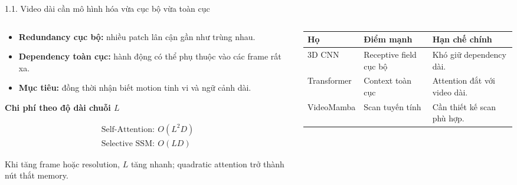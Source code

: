 \documentclass[aspectratio=169,9pt]{beamer}
\newcommand{\smallnote}[1]{{\fontsize{7.1}{8.4}\selectfont #1\par}}
\newcommand{\heading}[1]{{\bfseries\color{PTITRed} #1\par}}
\newcommand{\tightitems}{\setlength{\itemsep}{0.13em}\setlength{\parskip}{0pt}\setlength{\parsep}{0pt}}
\begin{document}
\begin{frame}{1.1. Video dài cần mô hình hóa vừa cục bộ vừa toàn cục}
  \vspace{0.08cm}
  \begin{columns}[T,onlytextwidth]
    \begin{column}{0.48\textwidth}
      \begin{tcolorbox}[titlepanel,title=Hai tính chất đối nghịch,equal height group=s1_top]
        \begin{itemize}\tightitems
          \item \textbf{Redundancy cục bộ:} nhiều patch lân cận gần như trùng nhau.
          \item \textbf{Dependency toàn cục:} hành động có thể phụ thuộc vào các frame rất xa.
          \item \textbf{Mục tiêu:} đồng thời nhận biết motion tinh vi và ngữ cảnh dài.
        \end{itemize}
      \end{tcolorbox}
      \vspace{0.14cm}
      \begin{tcolorbox}[panel,equal height group=s1_bot]
        \heading{Chi phí theo độ dài chuỗi $L$}
        \vspace{-0.12cm}
        \[
          \begin{array}{c}
            \text{Self-Attention}:\ O(L^2D)\\[-0.1ex]
            \text{Selective SSM}:\ O(LD)
          \end{array}
        \]
        \smallnote{Khi tăng frame hoặc resolution, $L$ tăng nhanh; quadratic attention trở thành nút thắt memory.}
      \end{tcolorbox}
    \end{column}
    \begin{column}{0.48\textwidth}
      \begin{tcolorbox}[titlepanel,title=Khoảng trống của các họ mô hình,equal height group=s1_top]
        \renewcommand{\arraystretch}{1.28}
        {\fontsize{7.4}{8.5}\selectfont\begin{tabularx}{\linewidth}{@{}L{1.72cm}Y Y@{}}
          \toprule
          \textbf{Họ} & \textbf{Điểm mạnh} & \textbf{Hạn chế chính}\\
          \midrule
          3D CNN & Receptive field cục bộ & Khó giữ dependency dài.\\
          Transformer & Context toàn cục & Attention đắt với video dài.\\
          VideoMamba & Scan tuyến tính & Cần thiết kế scan phù hợp.\\

\end{tabularx}}
\end{tcolorbox}
\end{column}
\end{columns}
\end{frame}
\end{document}

